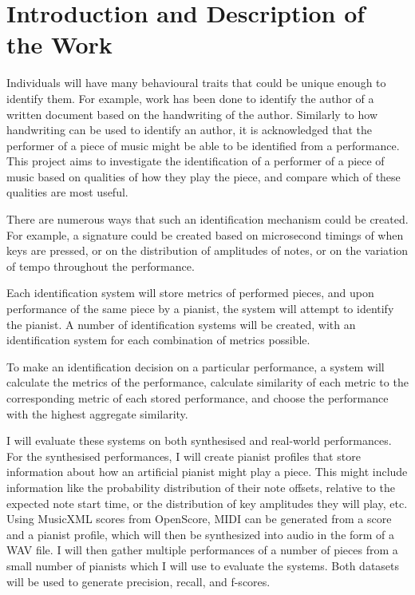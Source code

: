 \documentclass[12pt]{article}
\begin{document}

\section{Introduction and Description of the Work}

Individuals will have many behavioural traits that could be unique enough to identify them. For example, work has been done to identify the author of a written document based on the handwriting of the author. Similarly to how handwriting can be used to identify an author, it is acknowledged that the performer of a piece of music might be able to be identified from a performance. This project aims to investigate the identification of a performer of a piece of music based on qualities of how they play the piece, and compare which of these qualities are most useful.

There are numerous ways that such an identification mechanism could be created. For example, a signature could be created based on microsecond timings of when keys are pressed, or on the distribution of amplitudes of notes, or on the variation of tempo throughout the performance.

Each identification system will store metrics of performed pieces, and upon performance of the same piece by a pianist, the system will attempt to identify the pianist. A number of identification systems will be created, with an identification system for each combination of metrics possible.

To make an identification decision on a particular performance, a system will calculate the metrics of the performance, calculate similarity of each metric to the corresponding metric of each stored performance, and choose the performance with the highest aggregate similarity.

I will evaluate these systems on both synthesised and real-world performances. For the synthesised performances, I will create pianist profiles that store information about how an artificial pianist might play a piece. This might include information like the probability distribution of their note offsets, relative to the expected note start time, or the distribution of key amplitudes they will play, etc. Using MusicXML scores from OpenScore, MIDI can be generated from a score and a pianist profile, which will then be synthesized into audio in the form of a WAV file. I will then gather multiple performances of a number of pieces from a small number of pianists which I will use to evaluate the systems. Both datasets will be used to generate precision, recall, and f-scores.
\end{document}
